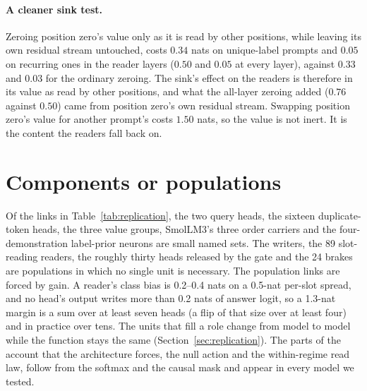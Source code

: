 \documentclass{article}
\begin{document}
\paragraph{A cleaner sink test.} Zeroing position zero's value only as it is read by other positions, while leaving its own residual stream untouched, costs $0.34$ nats on unique-label prompts and $0.05$ on recurring ones in the reader layers ($0.50$ and $0.05$ at every layer), against $0.33$ and $0.03$ for the ordinary zeroing. The sink's effect on the readers is therefore in its value as read by other positions, and what the all-layer zeroing added ($0.76$ against $0.50$) came from position zero's own residual stream. Swapping position zero's value for another prompt's costs $1.50$ nats, so the value is not inert. It is the content the readers fall back on.

\section{Components or populations}\label{app:populations}
Of the links in Table~\ref{tab:replication}, the two query heads, the sixteen duplicate-token heads, the three value groups, SmolLM3's three order carriers and the four-demonstration label-prior neurons are small named sets. The writers, the 89 slot-reading readers, the roughly thirty heads released by the gate and the 24 brakes are populations in which no single unit is necessary. The population links are forced by gain. A reader's class bias is 0.2--0.4 nats on a 0.5-nat per-slot spread, and no head's output writes more than 0.2 nats of answer logit, so a 1.3-nat margin is a sum over at least seven heads (a flip of that size over at least four) and in practice over tens. The units that fill a role change from model to model while the function stays the same (Section~\ref{sec:replication}). The parts of the account that the architecture forces, the null action and the within-regime read law, follow from the softmax and the causal mask and appear in every model we tested.
\end{document}
